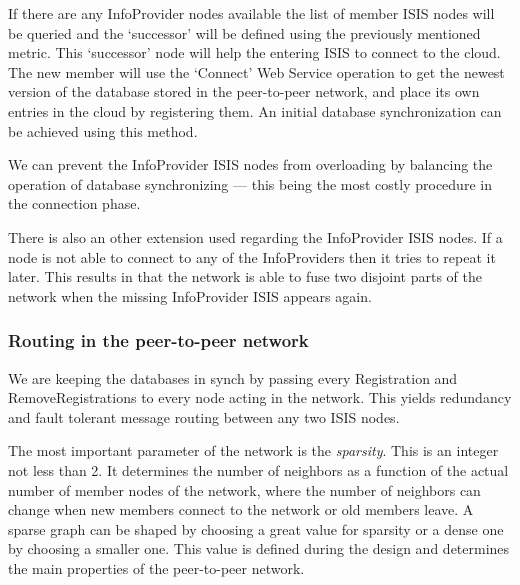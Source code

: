 \documentclass{book}
\begin{document}
If there are any InfoProvider nodes available the list of member ISIS nodes will be queried and the `successor' will be defined using the previously mentioned metric. This `successor' node will help the entering ISIS to connect to the cloud. The new member will use the `Connect' Web Service operation to get the newest version of the database stored in the peer-to-peer network, and place its own entries in the cloud by registering them. An initial database synchronization can be achieved using this method.

We can prevent the InfoProvider ISIS nodes from overloading by balancing the operation of database synchronizing --- this being the most costly procedure in the connection phase.

There is also an other extension used regarding the InfoProvider ISIS nodes. If a node is not able to connect to any of the InfoProviders then it tries to repeat it later. This results in that the network is able to fuse two disjoint parts of the network when the missing InfoProvider ISIS appears again.

\subsubsection{Routing in the peer-to-peer network}
We are keeping the databases in synch by passing every Registration and RemoveRegistrations to every node acting in the network. This yields redundancy and fault tolerant message routing between any two ISIS nodes.

The most important parameter of the network is the {\it sparsity}. This is an integer not less than 2. It determines the number of neighbors as a function of the actual number of member nodes of the network, where the number of neighbors can change when new members connect to the network or old members leave. A sparse graph can be shaped by choosing a great value for sparsity or a dense one by choosing a smaller one. This value is defined during the design and determines the main properties of the peer-to-peer network.
\begin{figure}[ht]
\end{figure}
\end{document}
